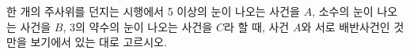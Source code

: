 한 개의 주사위를 던지는 시행에서 5 이상의 눈이 나오는 사건을 $A$, 소수의 눈이 나오는 사건을 $B$, 3의 약수의 눈이 나오는 사건을 $C$라 할 때, 사건 $A$와 서로 배반사건인 것만을 보기에서 있는 대로 고르시오.
